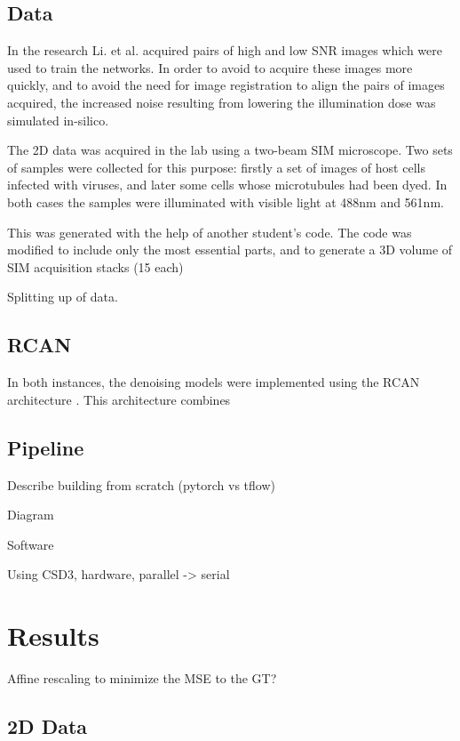 \documentclass[12pt]{article}
\begin{document}
\subsection{Data}

In the research Li. et al. acquired pairs of high and low SNR images which were used to train the networks.
In order to avoid to acquire these images more quickly, and to avoid the need for image registration to align the pairs of images acquired,
the increased noise resulting from lowering the illumination dose was simulated in-silico.

The 2D data was acquired in the lab using a two-beam SIM microscope.
Two sets of samples were collected for this purpose: firstly a set of images of host cells infected with viruses,
and later some cells whose microtubules had been dyed.
In both cases the samples were illuminated with visible light at 488nm and 561nm.

This was generated with the help of another student's code.
The code was modified to include only the most essential parts, and to generate a 3D volume of SIM acquisition stacks (15 each)

Splitting up of data.


\subsection{RCAN}

In both instances, the denoising models were implemented using the RCAN architecture \cite{rcan}.
This architecture combines


\subsection{Pipeline}
Describe building from scratch (pytorch vs tflow)

Diagram

Software

Using CSD3, hardware, parallel -> serial

\section{Results}

Affine rescaling to minimize the MSE to the GT?

\subsection{2D Data}
\end{document}
